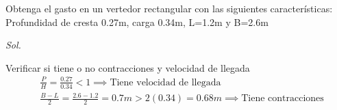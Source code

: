 \begin{table}[h!]
        \caption{Fórmulas experimentales para determinar el coeficiente de gasto $C_o$ aplicable a la ecuación \eqref{eq:coeficientedegasto} para vertedores rectangulares con contracciones laterales o sin ellas. En el caso de vertedores sin contracciones laterales, haba $L=B$ en las fórmulas}
        \label{tabhb46}
    \end{table}
\begin{example}
    Obtenga el gasto en un vertedor rectangular con las siguientes características: Profundidad de cresta 0.27m, carga 0.34m, L=1.2m y B=2.6m
\end{example}

\textit{ Sol. }

Verificar si tiene o no contracciones y velocidad de llegada
\begin{align*}
    &\frac{P}{H} = \frac{0.27}{0.34} < 1 \implies \text{Tiene velocidad de llegada}\\
    &\frac{B - L}{2} = \frac{2.6 - 1.2}{2} = 0.7m > 2(0.34) = 0.68m\implies \text{Tiene contracciones}
\end{align*}

